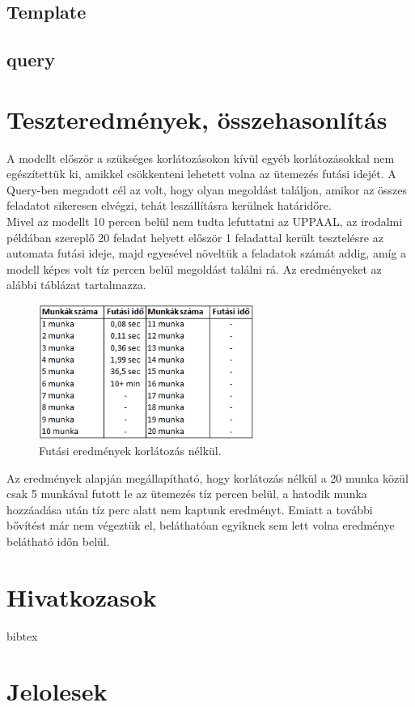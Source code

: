 \documentclass {report}
\begin{document}
    \section{Template}
    \section{query}
    
\chapter{Teszteredmények, összehasonlítás}
A modellt először a szükséges korlátozásokon kívül egyéb korlátozásokkal nem egészítettük ki, amikkel csökkenteni lehetett volna az ütemezés futási idejét. A Query-ben megadott cél az volt, hogy olyan megoldást találjon, amikor az összes feladatot sikeresen elvégzi, tehát leszállításra kerülnek határidőre.\\
Mivel az modellt 10 percen belül nem tudta lefuttatni az UPPAAL, az irodalmi példában szereplő 20 feladat helyett először 1 feladattal került tesztelésre az automata futási ideje, majd egyesével növeltük a feladatok számát addig, amíg a modell képes volt tíz percen belül megoldást találni rá. Az eredményeket az alábbi táblázat tartalmazza.
\begin{figure}
\begin{center}
\includegraphics[height=4.4cm]{tablazat_2}
\caption{Futási eredmények korlátozás nélkül.}
\end{center}
\end{figure}

Az eredmények alapján megállapítható, hogy korlátozás nélkül a 20 munka közül csak 5 munkával futott le az ütemezés tíz percen belül, a hatodik munka hozzáadása után tíz perc alatt nem kaptunk eredményt. Emiatt a további bővítést már nem végeztük el, beláthatóan egyiknek sem lett volna eredménye belátható időn belül.





\chapter*{Hivatkozasok}
bibtex

\appendix

\chapter{Jelolesek}
\end{document}
